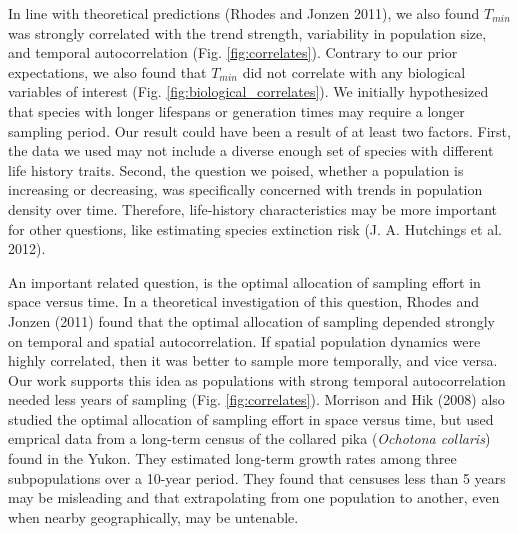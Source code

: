 \documentclass[12pt,]{article}
\begin{document}
In line with theoretical predictions (Rhodes and Jonzen 2011), we also
found \(T_{min}\) was strongly correlated with the trend strength,
variability in population size, and temporal autocorrelation (Fig.
\ref{fig:correlates}). Contrary to our prior expectations, we also found
that \(T_{min}\) did not correlate with any biological variables of
interest (Fig. \ref{fig:biological_correlates}). We initially
hypothesized that species with longer lifespans or generation times may
require a longer sampling period. Our result could have been a result of
at least two factors. First, the data we used may not include a diverse
enough set of species with different life history traits. Second, the
question we poised, whether a population is increasing or decreasing,
was specifically concerned with trends in population density over time.
Therefore, life-history characteristics may be more important for other
questions, like estimating species extinction risk (J. A. Hutchings et
al. 2012).

An important related question, is the optimal allocation of sampling
effort in space versus time. In a theoretical investigation of this
question, Rhodes and Jonzen (2011) found that the optimal allocation of
sampling depended strongly on temporal and spatial autocorrelation. If
spatial population dynamics were highly correlated, then it was better
to sample more temporally, and vice versa. Our work supports this idea
as populations with strong temporal autocorrelation needed less years of
sampling (Fig. \ref{fig:correlates}). Morrison and Hik (2008) also
studied the optimal allocation of sampling effort in space versus time,
but used emprical data from a long-term census of the collared pika
(\emph{Ochotona collaris}) found in the Yukon. They estimated long-term
growth rates among three subpopulations over a 10-year period. They
found that censuses less than 5 years may be misleading and that
extrapolating from one population to another, even when nearby
geographically, may be untenable.
\end{document}
